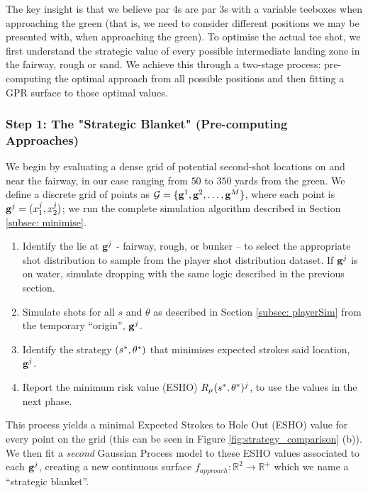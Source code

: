 \documentclass[11pt, letterpaper]{article}
\begin{document}
The key insight is that we believe par 4s are par 3s with a variable teeboxes when approaching the green (that is, we need to consider different positions we may be presented with, when approaching the green). To optimise the actual tee shot, we first understand the strategic value of every possible intermediate landing zone in the fairway, rough or sand. We achieve this through a two-stage process: pre-computing the optimal approach from all possible positions and then fitting a GPR surface to those optimal values.

\subsubsection{Step 1: The "Strategic Blanket" (Pre-computing Approaches)}
\label{subsec: strategicBlanket}
We begin by evaluating a dense grid of potential second-shot locations on and near the fairway, in our case ranging from $50$ to $350$ yards from the green. We define a discrete grid of points as $\mathcal{G} = \{\mathbf{g} ^1, \mathbf{g}^2, \ldots, \mathbf{g}^M\}$, where each point is $\mathbf{g}^j = (x^{j}_1, x^{j}_2)$; we run the complete simulation  algorithm described in Section \ref{subsec: minimise}.

\begin{enumerate}
    \item Identify the lie at $\mathbf{g}^j$ - fairway, rough, or bunker –  to select the appropriate shot distribution to sample from the player shot distribution dataset. If $\mathbf{g}^j$ is on water, simulate dropping with the same logic described in the previous section.
    \item Simulate shots for all $s$ and $\theta$ as described in Section \ref{subsec: playerSim} from the temporary ``origin'', $\mathbf{g}^j$.
    \item Identify the strategy $(s^*, \theta^*)$ that minimises expected strokes said location, $\mathbf{g}^j$.
    \item Report the minimum risk value (ESHO) $R_{\mu}(s^*, \theta^*)^j$, to use the values in the next phase.
\end{enumerate}
This process yields a minimal Expected Strokes to Hole Out (ESHO) value for every point on the grid (this can be seen in Figure \ref{fig:strategy_comparison} (b)). We then fit a \textit{second} Gaussian Process model to these ESHO values associated to each $\mathbf{g}^j$, creating a new continuous surface $f_{approach}: \mathbb{R}^2\to \mathbb{R}^+$ which we name a ``strategic blanket''. 
\end{document}
